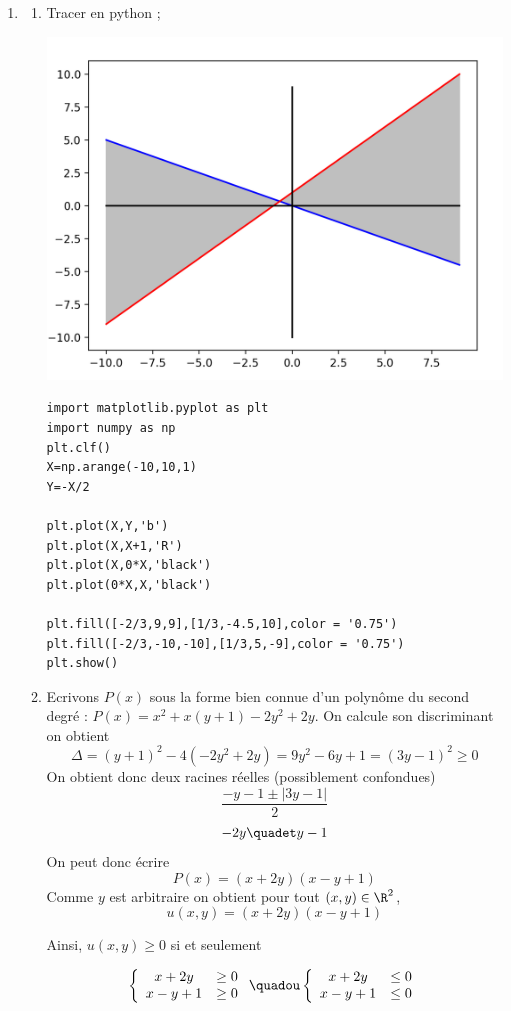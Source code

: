 \begin{correction}
\begin{enumerate}
\item \begin{enumerate}
\item Tracer en python ; \begin{center}
\includegraphics[scale=0.4]{EetF.png}
\end{center}
\begin{lstlisting}
import matplotlib.pyplot as plt
import numpy as np
plt.clf()
X=np.arange(-10,10,1)
Y=-X/2

plt.plot(X,Y,'b')
plt.plot(X,X+1,'R')
plt.plot(X,0*X,'black')
plt.plot(0*X,X,'black')

plt.fill([-2/3,9,9],[1/3,-4.5,10],color = '0.75')
plt.fill([-2/3,-10,-10],[1/3,5,-9],color = '0.75')
plt.show()
\end{lstlisting}
\item Ecrivons $P(x)$ sous la forme bien connue d'un polynôme du second degré : $P(x) = x^2 +x(y+1) -2y^2+2y$. On calcule son discriminant on obtient 
$$\Delta = (y+1)^2 -4 (-2y^2+2y) = 9y^2 - 6y +1= (3y-1)^2\geq 0$$
On obtient donc deux racines réelles (possiblement confondues) 
$$\frac{-y-1 \pm|3y-1|}{2} $$
$$-2y  \quadet  y-1$$
On peut donc écrire 
$$P(x) = (x+2y) (x-y+1)$$
Comme $y$ est arbitraire on obtient pour tout $(x,y) \in \R^2$, $$u(x,y) = (x+2y) (x-y+1)$$

Ainsi, $u(x,y) \geq 0$ si et seulement 

$$\left\{ 
\begin{array}{cc}
x+2y &\geq 0\\
x-y+1&\geq 0
\end{array}\right. 
\quadou 
\left\{ 
\begin{array}{cc}
x+2y &\leq 0\\
x-y+1&\leq 0
\end{array}\right.$$


\end{enumerate}
\end{enumerate}
\end{correction}
